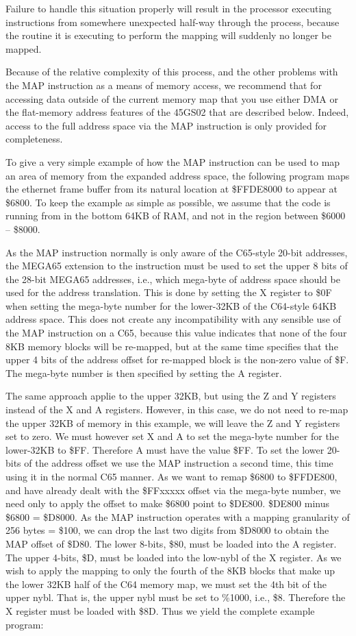 Failure to handle this situation properly will result in the processor executing instructions
from somewhere unexpected half-way through the process, because the routine it is executing
to perform the mapping will suddenly no longer be mapped.

Because of the relative complexity of this process, and the other problems with the MAP instruction
as a means of memory access, we recommend that for accessing data outside of the current memory
map that you use either DMA or the flat-memory address features of the 45GS02 that are described below.
Indeed, access to the full address space via the MAP instruction is only provided for completeness.

To give a very simple example of how the MAP instruction can be used to map an area of memory from
the expanded address space, the following program maps the ethernet frame buffer from its natural location
at \$FFDE8000 to appear at \$6800.  To keep the example as simple as possible, we assume that the code
is running from in the bottom 64KB of RAM, and not in the region between \$6000 -- \$8000.

As the MAP instruction normally is only aware of the C65-style 20-bit addresses, the MEGA65 extension to the
instruction must be used to set the upper 8 bits of the 28-bit MEGA65 addresses, i.e., which mega-byte of address
space should be used for the address translation.  This is done by setting the X
register to \$0F when setting the mega-byte number for the lower-32KB of the C64-style 64KB address space.
This does not create any incompatibility with any sensible use of the MAP instruction on a C65, because this
value indicates that none of the four 8KB memory blocks will be re-mapped, but at the same time specifies that
the upper 4 bits of the address offset for re-mapped block is the non-zero value of \$F.  The mega-byte number
is then specified by setting the A register.

The same approach applie to the upper 32KB, but using the Z and Y
registers instead of the X and A registers.  However, in this case, we do not need to re-map the upper 32KB of
memory in this example, we will leave the Z and Y registers set to zero.  We must however set X and A to
set the mega-byte number for the lower-32KB to \$FF. Therefore A must have the value \$FF.  To set the lower 20-bits
of the address offset we use the MAP instruction a second time, this time using it in the normal C65 manner.
As we want to remap \$6800 to \$FFDE800, and have already dealt with the \$FFxxxxx offset via the mega-byte number,
we need only to apply the offset to make \$6800 point to \$DE800. \$DE800 minus \$6800 = \$D8000.  As the MAP instruction
operates with a mapping granularity of 256 bytes = \$100, we can drop the last two digits from \$D8000 to obtain the
MAP offset of \$D80. The lower 8-bits, \$80, must be loaded into the A register. The upper 4-bits, \$D, must be loaded into
the low-nybl of the X register.  As we wish to apply the mapping to only the fourth of the 8KB blocks that make up the
lower 32KB half of the C64 memory map, we must set the 4th bit of the upper nybl. That is, the upper nybl must be set
to \%1000, i.e., \$8.  Therefore the X register must be loaded with \$8D.  Thus we yield the complete example program:
   
